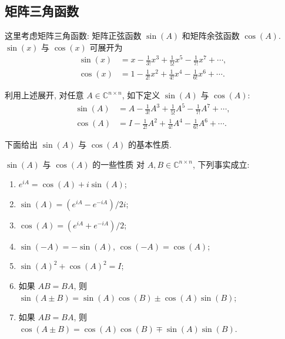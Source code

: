 \subsection{{矩阵三角函数}}\label{sec:matrix-trigonometric-functions}

{这里考虑矩阵三角函数: 矩阵正弦函数 $\sin(A)$ 和矩阵余弦函数 $\cos(A)$. $\sin(x)$ 与 $\cos(x)$ 可展开为}
\[\begin{aligned}\sin(x)&=x-\frac{1}{3!}x^3+\frac{1}{5!}x^5-\frac{1}{7!}x^7+\cdots,\\\cos(x)&=1-\frac{1}{2!}x^2+\frac{1}{4!}x^4-\frac{1}{6!}x^6+\cdots.\end{aligned}\]

{利用上述展开, 对任意 $A\in\mathbb{C}^{n\times n}$, 如下定义 $\sin(A)$ 与 $\cos(A)$:}
\[\begin{aligned}\sin(A)&=A-\frac{1}{3!}A^3+\frac{1}{5!}A^5-\frac{1}{7!}A^7+\cdots,\\\cos(A)&=I-\frac{1}{2!}A^2+\frac{1}{4!}A^4-\frac{1}{6!}A^6+\cdots.\end{aligned}\]

{\leavevmode{}\label{srcpage:printed-203}下面给出 $\sin(A)$ 与 $\cos(A)$ 的基本性质.}

\begin{Theorem}{{$\sin(A)$ 与 $\cos(A)$ 的一些性质}}\label{thm:matrix-trigonometric-properties}
{对 $A,B\in\mathbb{C}^{n\times n}$, 下列事实成立:}
\begin{enumerate}[label=(\arabic*)]
\item\label{part:matrix-trig-euler} $e^{iA}=\cos(A)+i\sin(A)$;
\item\label{part:matrix-sine-exponentials} $\sin(A)=(e^{iA}-e^{-iA})/2i$;
\item\label{part:matrix-cosine-exponentials} $\cos(A)=(e^{iA}+e^{-iA})/2$;
\item $\sin(-A)=-\sin(A)$, $\cos(-A)=\cos(A)$;
\item $\sin(A)^2+\cos(A)^2=I$;
\item {如果 $AB=BA$, 则\newline{}$\sin(A\pm B)=\sin(A)\cos(B)\pm\cos(A)\sin(B)$;}
\item {如果 $AB=BA$, 则\newline{}$\cos(A\pm B)=\cos(A)\cos(B)\mp\sin(A)\sin(B)$.}
\end{enumerate}
\end{Theorem}

